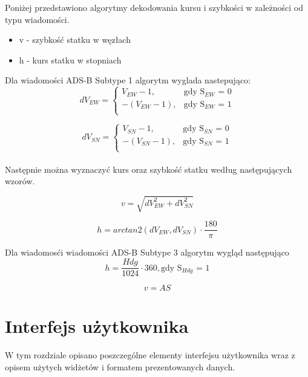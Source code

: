 \documentclass[eng,printmode]{mgr}
\begin{document}
\begin{table}[htb]
\begin{tabular}{|c|c|c|c|c|}
 \end{tabular}
\end{table}


Poniżej przedstawiono algorytmy dekodowania kursu i szybkości w zależności od typu wiadomości.
\begin{itemize}
\item v - szybkość statku w węzłach
\item h - kurs statku w stopniach
\end{itemize}

\noindent
Dla wiadomości ADS-B Subtype 1 algorytm wyglada nastepująco:
\begin{equation}
\renewcommand*{\arraystretch}{1.3}
dV_{EW}= \left\{ \begin{array}{ll}
V_{EW} - 1, & \textrm{gdy S$_{EW}$ = 0}\\
-(V_{EW} - 1), & \textrm{gdy S$_{EW}$ = 1}\\
\end{array} \right.
\end{equation}

\begin{equation}
\renewcommand*{\arraystretch}{1.3}
dV_{SN}= \left\{ \begin{array}{ll}
V_{SN} - 1, & \textrm{gdy S$_{SN}$ = 0}\\
-(V_{SN} - 1), & \textrm{gdy S$_{SN}$ = 1}\\
\end{array} \right.
\end{equation}
\\
\noindent
Następnie można wyznaczyć kurs oraz szybkość statku według następujących wzorów.

\begin{equation}
v = \sqrt{dV_{EW}^2 + dV_{SN}^2}
\end{equation}

\begin{equation}
h = arctan2(dV_{EW},dV_{SN}) \cdot \frac{180}{\pi}
\end{equation}


Dla wiadomosći wiadomości ADS-B Subtype 3 algorytm wygląd następująco
\begin{equation}
h = \frac{Hdg}{1024} \cdot 360, \textrm{gdy S$_{Hdg}$ = 1}
\end{equation}

\begin{equation}
v = AS
\end{equation}


\chapter{Interfejs użytkownika}
W tym rozdziale opisano poszczególne elementy interfejsu użytkownika wraz z opisem użytych widżetów i formatem prezentowanych danych.
\end{document}

